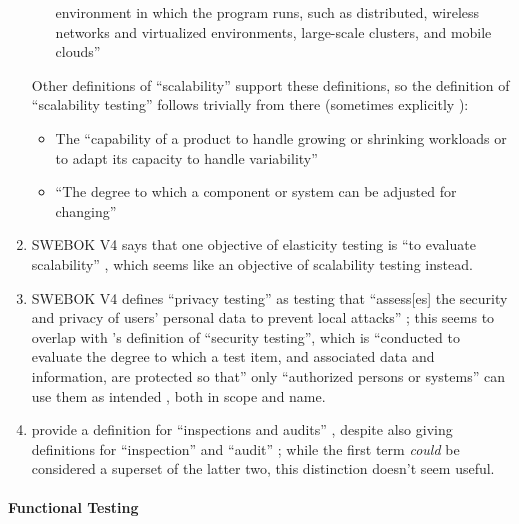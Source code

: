 \begin{enumerate}
\begin{enumerate}
                        environment in which the program runs, such as
                        distributed, wireless networks and virtualized
                        environments, large-scale clusters, and mobile clouds''
                        \citep[p.~5-5]{SWEBOK2024}
            \end{enumerate}
            Other definitions of ``scalability'' support these definitions, so
            the definition of ``scalability testing'' follows trivially from there
            (sometimes explicitly ):
            \begin{itemize}
                  \item The ``capability of a product to handle growing or
                        shrinking workloads or to adapt its capacity to handle
                        variability'' \citep{ISO_IEC2023a}
                  \item ``The degree to which a component or system can be
                        adjusted for changing'' 
            \end{itemize}
      \item SWEBOK V4 says that one objective of elasticity testing is ``to
            evaluate scalability'' \citep[p.~5-9]{SWEBOK2024}, which seems like
            an objective of scalability testing instead.
      \item SWEBOK V4 defines ``privacy testing'' as testing that ``assess[es]
            the security and privacy of users' personal data to prevent local
            attacks'' \cite[p.~5-10]{SWEBOK2024}; this seems to overlap with
            \citeauthor{IEEE2022}'s definition of ``security testing'', which is
            ``conducted to evaluate the degree to which a test item, and
            associated data and information, are protected so that'' only
            ``authorized persons or systems'' can use them as intended
            \citeyearpar{IEEE2022}, both in scope and name.
      \item \citeauthor*{IEEE2017} provide a definition for ``inspections and
            audits'' \citeyearpar[p.~228]{IEEE2017}, despite also giving
            definitions for ``inspection'' \citeyearpar[p.~227]{IEEE2017} and
            ``audit'' \citeyearpar[p.~36]{IEEE2017}; while the first term
            \emph{could} be considered a superset of the latter two, this
            distinction doesn't seem useful.
\end{enumerate}

\paragraph{Functional Testing}

